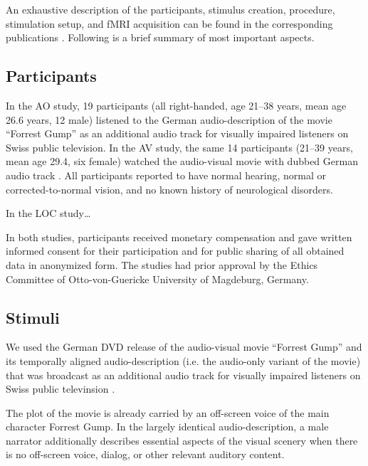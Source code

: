 \documentclass[english]{article}
\begin{document}
An exhaustive description of the participants, stimulus creation, procedure,
stimulation setup, and fMRI acquisition can be found in the corresponding
publications  \citep{hanke2014audiomovie, hanke2016simultaneous,
sengupta2016extension}. Following is a brief summary of most important aspects.



\subsection{Participants}


In the AO study, 19 participants (all right-handed, age 21–38 years, mean age
26.6 years, 12 male) listened to the German audio-description
\citep{ForrestGumpGermanAD} of the movie ``Forrest Gump''
\citep{ForrestGumpMovie} as an additional audio track for visually impaired
listeners on Swiss public television. In the AV study, the same 14 participants
(21–39 years, mean age 29.4, six female) watched the audio-visual movie with dubbed German audio track \citep{ForrestGumpDVD}. All participants reported to have normal hearing, normal or corrected-to-normal vision, and no known history of neurological disorders.

In the LOC study\dots

In both studies, participants received monetary compensation and gave written informed consent for their participation and for public sharing of all obtained data in anonymized form. The studies had prior approval by the Ethics Committee of Otto-von-Guericke University of Magdeburg, Germany.


\subsection{Stimuli}
We used the German DVD release \citep{ForrestGumpDVD} of
the audio-visual movie ``Forrest Gump'' \citep{ForrestGumpMovie} and its
temporally aligned audio-description (i.e. the audio-only variant of the movie)
that was broadcast as an additional audio track for visually impaired listeners
on Swiss public televinsion \citep{ForrestGumpGermanAD}.

The plot of the movie is already carried by an off-screen voice of the main
character Forrest Gump.  In the largely identical audio-description, a male
narrator additionally describes essential aspects of the visual scenery when
there is no off-screen voice, dialog, or other relevant auditory content.
\end{document}
